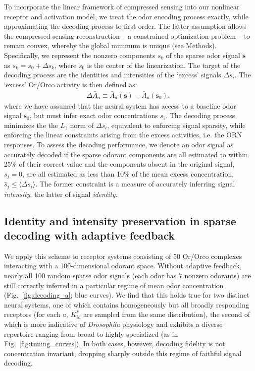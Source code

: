 To incorporate the linear framework of compressed sensing into our nonlinear receptor and activation model, we treat the odor encoding process exactly, while approximating the decoding process to first order. The latter assumption allows the compressed sensing reconstruction -- a constrained optimization problem -- to remain convex, whereby the global minimum is unique (see Methods). Specifically, we represent the nonzero components $s_k$ of the sparse odor signal $\mathbf s$ as $s_k = s_0 + \Delta s_k$, where $s_0$ is the center of the linearization. The target of the decoding process are the identities and intensities of the `excess' signals $\Delta s_i$. The `excess' Or/Orco activity is then defined as:
\begin{align}
\Delta \bar A_a \equiv \bar A_a(\mathbf s) - \bar A_a(\mathbf s_0),
\end{align}
where we have assumed that the neural system has access to a baseline odor signal $\mathbf s_0$, but must infer exact odor concentrations $s_i$. The decoding process minimizes the the $L_1$ norm of $\Delta s_i$, equivalent to enforcing signal sparsity, while enforcing the linear constraints arising from the excess activities, i.e. the ORN responses. To assess the decoding performance, we denote an odor signal as accurately decoded if the sparse odorant components are all estimated to within 25\% of their correct value and the components absent in the original signal, $s_j = 0$, are all estimated as less than 10\% of the mean excess concentration, $\hat s_j \le \langle \Delta s_i \rangle$. The former constraint is a measure of accurately inferring signal \textit{intensity}; the latter of signal \textit{identity}. 

\subsection{Identity and intensity preservation in sparse decoding with adaptive feedback}

We apply this scheme to receptor systems consisting of 50 Or/Orco complexes interacting with a 100-dimensional odorant space. Without adaptive feedback, nearly all 100 random sparse odor signals (each odor has $7$ nonzero odorants) are still correctly inferred in a particular regime of mean odor concentration (Fig.~\ref{fig:decoding_a}; blue curves). We find that this holds true for two distinct neural systems, one of which contains homogeneously but all broadly responding receptors (for each $a$, $K^*_{ia}$ are sampled from the same distribution), the second of which is more indicative of \textit{Drosophila} physiology and exhibits a diverse repertoire ranging from broad to highly specialized (as in Fig.~\ref{fig:tuning_curves}). In both cases, however, decoding fidelity is not concentration invariant, dropping sharply outside this regime of faithful signal decoding.

